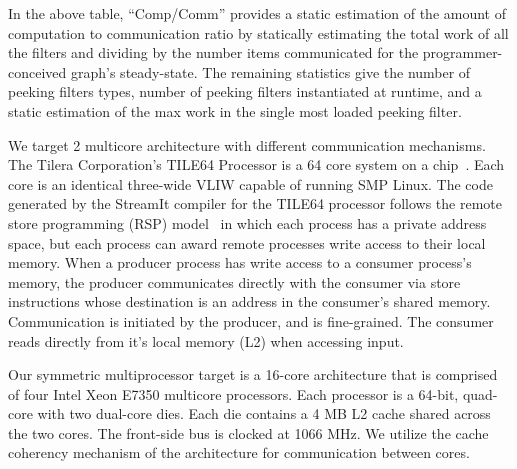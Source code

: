 In the above table, ``Comp/Comm'' provides a static estimation of the
amount of computation to communication ratio by statically estimating the total
work of all the filters and dividing by the number items communicated
for the programmer-conceived graph's steady-state.  The remaining
statistics give the number of peeking filters types, number of peeking
filters instantiated at runtime, and a static estimation of the max
work in the single most loaded peeking filter.

We target 2 multicore architecture with different communication
mechanisms.  The Tilera Corporation's TILE64 Processor is a 64 core
system on a chip~\cite{tilera}.  Each core is an identical three-wide
VLIW capable of running SMP Linux. The code generated by the StreamIt
compiler for the TILE64 processor follows the remote store programming
(RSP) model~\cite{rsp10} in which each process has a private address
space, but each process can award remote processes write access to
their local memory. When a producer process has write access to a
consumer process's memory, the producer communicates directly with the
consumer via store instructions whose destination is an address in the
consumer's shared memory.  Communication is initiated by the producer,
and is fine-grained.  The consumer reads directly from it's local
memory (L2) when accessing input.

Our symmetric multiprocessor target is a 16-core architecture that is
comprised of four Intel Xeon E7350 multicore processors.  Each processor
is a 64-bit, quad-core with two dual-core dies.  Each die contains a 4
MB L2 cache shared across the two cores.  The front-side bus is clocked
at 1066 MHz.  We utilize the cache coherency mechanism of the
architecture for communication between cores. 



